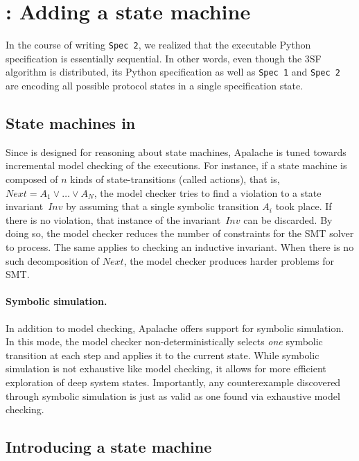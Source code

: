 
\section{\SpecThree{}: Adding a state machine}\label{sec:spec3}

In the course of writing \texttt{Spec 2}, we realized
that the executable Python specification is essentially sequential. In other
words, even though the 3SF algorithm is distributed, its Python
specification as well as \texttt{Spec 1} and \texttt{Spec 2} are encoding
all possible protocol states in a single specification state.

\subsection{State machines in \tlap{}}

Since \tlap{} is designed for reasoning about state machines, Apalache is tuned
towards incremental model checking of the executions. For instance, if a state
machine is composed of $n$ kinds of state-transitions (called actions), that
is, $\mathit{Next} = A_1 \vee \dots \vee A_N$, the model checker tries to find
a violation to a state invariant~$\textit{Inv}$ by assuming that a single
symbolic transition $A_i$ took place. If there is no violation, that instance
of the invariant~$\textit{Inv}$ can be discarded. By doing so, the model
checker reduces the number of constraints for the SMT solver to process.  The
same applies to checking an inductive invariant. When there is no such
decomposition of $\mathit{Next}$, the model checker produces harder problems
for SMT\@.

\paragraph{Symbolic simulation.} In addition to model checking, Apalache offers
support for symbolic simulation. In this mode, the model checker
non-deterministically selects \emph{one} symbolic transition at each step and
applies it to the current state. While symbolic simulation is not exhaustive
like model checking, it allows for more efficient exploration of deep system
states. Importantly, any counterexample discovered through symbolic simulation
is just as valid as one found via exhaustive model checking.

\subsection{Introducing a state machine}

